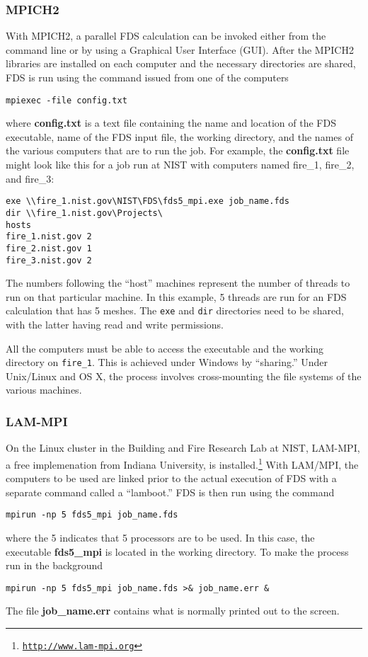 \documentclass[11pt]{book}
\newcommand{\ct}{\tt\small}
\begin{document}
\subsubsection{MPICH2}
With MPICH2, a parallel FDS calculation can be invoked either
from the command line or by using a Graphical User Interface
(GUI). After the MPICH2 libraries are installed on each computer and
the necessary directories are shared, FDS is run using the command
issued from one of the computers
\begin{verbatim}
mpiexec -file config.txt
\end{verbatim}
where {\bf config.txt} is a text file containing the name and location
of the FDS executable, name of the FDS input file, the working directory,
and the names of the various computers that are to run the job. For
example, the {\bf config.txt} file might look like this for a job run at NIST with computers named
fire\_1, fire\_2, and fire\_3:
\begin{verbatim}
exe \\fire_1.nist.gov\NIST\FDS\fds5_mpi.exe job_name.fds
dir \\fire_1.nist.gov\Projects\
hosts
fire_1.nist.gov 2
fire_2.nist.gov 1
fire_3.nist.gov 2
\end{verbatim}
The numbers following the ``host'' machines represent the number of threads to run on that particular machine. In this
example, 5 threads are run for an FDS calculation that has 5 meshes. The {\ct exe} and {\ct dir} directories need to be shared, with the
latter having read and write permissions.

\begin{warning}
\noindent
All the computers must be able to access the executable and the working directory on {\ct fire\_1}.
This is achieved under Windows by ``sharing.'' Under Unix/Linux and OS X, the process involves cross-mounting the file
systems of the various machines.
\end{warning}


\subsubsection{LAM-MPI}
On the Linux cluster in the Building and Fire Research Lab at NIST, LAM-MPI, a free implemenation from Indiana University,
is installed.\footnote{\href{http://www.lam-mpi.org}{{\ct http://www.lam-mpi.org}}}
With LAM/MPI, the computers to be used are linked prior to the actual execution of FDS with a separate
command called a ``lamboot.''
FDS is then run using the command
\begin{verbatim}
mpirun -np 5 fds5_mpi job_name.fds
\end{verbatim}
where the 5 indicates that 5 processors are to be used. In this case, the executable {\bf fds5\_mpi} is located in the
working directory. To make the process run in the background
\begin{verbatim}
mpirun -np 5 fds5_mpi job_name.fds >& job_name.err &
\end{verbatim}
The file {\bf job\_name.err} contains what is normally printed out to the screen.
\end{document}
